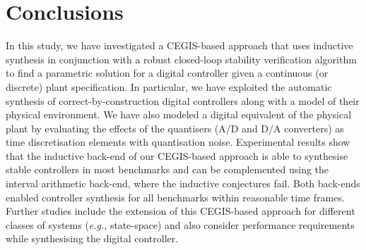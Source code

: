 \documentclass{sig-alternate-05-2015}
\begin{document}

\section{Conclusions}

In this study, we have investigated a CEGIS-based approach that uses inductive synthesis 
in conjunction with a robust closed-loop stability verification algorithm to find a parametric 
solution for a digital controller given a continuous (or discrete) plant specification.
In particular, we have exploited the automatic synthesis of correct-by-construction 
digital controllers along with a model of their physical environment.
We have also modeled a digital equivalent of the physical plant by evaluating the 
effects of the quantisers (A/D and D/A converters) as time discretisation elements 
with quantisation noise. Experimental results show that the inductive back-end of our
CEGIS-based approach is able to synthesise stable controllers in most benchmarks and can be 
complemented using the interval arithmetic back-end, where the inductive conjectures fail. 
Both back-ends enabled controller synthesis for all benchmarks within reasonable time frames.
Further studies include the extension of this CEGIS-based approach for different classes of systems
({\it e.g.}, state-space) and also consider performance requirements while synthesising 
the digital controller.



  

\end{document}
